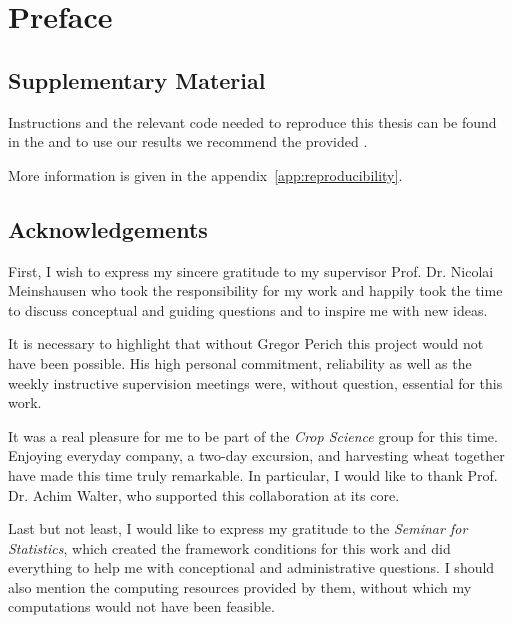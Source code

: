 \chapter*{Preface}

\section*{Supplementary Material}


Instructions and the relevant code needed to reproduce this thesis can be found in the \href{https://github.com/LGraz/MasterThesis-Code}{\color{blue}{GitHub repository}} and to use our results we recommend the provided \href{https://github.com/LGraz/CorrectTimeSeries }{\color{blue}{R-package}}.

More information is given in the appendix~\ref{app:reproducibility}.  


\section*{Acknowledgements}
First, I wish to express my sincere gratitude to my supervisor Prof. Dr. Nicolai Meinshausen who took the responsibility for my work and happily took the time to discuss conceptual and guiding questions and to inspire me with new ideas. 

It is necessary to highlight that without Gregor Perich this project would not have been possible. His high personal commitment, reliability as well as the weekly instructive supervision meetings were, without question, essential for this work. 

It was a real pleasure for me to be part of the \textit{Crop Science} group for this time. Enjoying everyday company, a two-day excursion, and harvesting wheat together have made this time truly remarkable. In particular, I would like to thank Prof. Dr. Achim Walter, who supported this collaboration at its core.  

Last but not least, I would like to express my gratitude to the \textit{Seminar for Statistics}, which created the framework conditions for this work and did everything to help me with conceptional and administrative questions. I should also mention the computing resources provided by them, without which my computations would not have been feasible.

